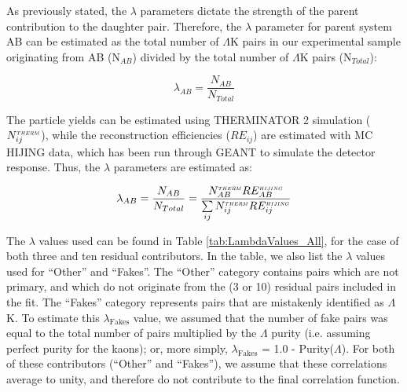 \documentclass[ALICE,manyauthors]{cernphprep}
\newcommand{\Lam}{$\Lambda$\xspace}
\newcommand{\LamK}{$\Lambda$K\xspace}
\begin{document}
 
As previously stated, the $\lambda$ parameters dictate the strength of the parent contribution to the daughter pair.  
Therefore, the $\lambda$ parameter for parent system AB can be estimated as the total number of $\Lambda$K pairs in our experimental sample originating from AB (N$_{AB}$) divided by the total number of $\Lambda$K pairs (N$_{Total}$):

\begin{equation}
\lambda_{AB} = \frac{N_{AB}}{N_{Total}}
\end{equation}

The particle yields can be estimated using THERMINATOR 2 simulation ($N_{ij}^{\scaleto{THERM}{3pt}}$), while the reconstruction efficiencies ($RE_{ij}$) are estimated with MC HIJING data, which has been run through GEANT to simulate the detector response.  Thus, the $\lambda$ parameters are estimated as:

\begin{equation}
\lambda_{AB} = \frac{N_{AB}}{N_{Total}} = \frac{N_{AB}^{\scaleto{THERM}{3pt}}RE_{AB}^{\scaleto{HIJING}{3pt}}}{\sum\limits_{ij} N_{ij}^{\scaleto{THERM}{3pt}}RE_{ij}^{\scaleto{HIJING}{3pt}}}
\end{equation}

The $\lambda$ values used can be found in Table \ref{tab:LambdaValues_All}, for the case of both three and ten residual contributors.  In the table, we also list the $\lambda$ values used for ``Other'' and ``Fakes''.  The ``Other'' category contains pairs which are not primary, and which do not originate from the (3 or 10) residual pairs included in the fit.  The ``Fakes'' category represents pairs that are mistakenly identified as \LamK.  To estimate this $\lambda_{\mathrm{Fakes}}$ value, we assumed that the number of fake pairs was equal to the total number of pairs multiplied by the \Lam purity (i.e. assuming perfect purity for the kaons); or, more simply, $\lambda_{\mathrm{Fakes}}$ = 1.0 - Purity(\Lam).  For both of these contributors (``Other'' and ``Fakes''), we assume that these correlations average to unity, and therefore do not contribute to the final correlation function.
\end{document}
